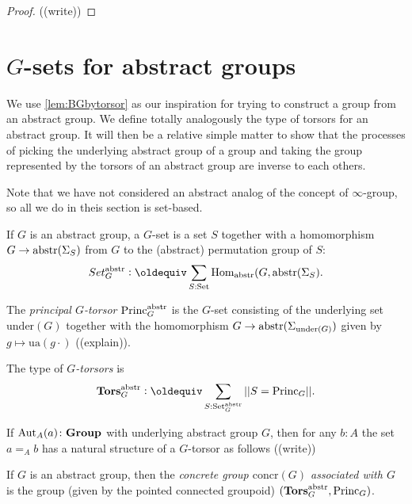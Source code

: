 \begin{proof}
  ((write))
\end{proof}

\section{$G$-sets for abstract groups}
\label{sec:Gsetforabstract}


We use \cref{lem:BGbytorsor} as our inspiration for trying to construct a group from an abstract group.  We define totally analogously the type of torsors for an abstract group.  It will then be a relative simple matter to show that the processes of picking the underlying abstract group of a group and taking the group represented by the torsors of an abstract group are inverse to each others.

Note that we have not considered an abstract analog of the concept of $\infty$-group, so all we do in theis section is set-based.

\begin{definition}
\label{def:abstrGtorsors}
  If $G$ is an abstract group, a $G$-set is a set $S$ together with a homomorphism
$G\to\mathrm{abstr}(\Sigma_S)$
from $G$ to the (abstract) permutation group of $S$:
$$Set_G^\abstr\defequi \sum_{S:\Set}\Hom_\abstr(G,\abstr(\Sigma_S).$$

The \emph{principal $G$-torsor} $\mathrm{Princ}_G^{\mathrm{abstr}}$ is the $G$-set consisting of the underlying set $\mathrm{under}(G)$ together with the homomorphism $G\to\mathrm{abstr}(\Sigma_{\mathrm{under}(G)})$ given by $g\mapsto \mathrm{ua}(g\cdot)$ ((explain)).

The type of \emph{$G$-torsors} is
$$\typetorsor_G^\abstr\defequi\sum_{S:\Set_G^\abstr}||S=\princ_G||.$$
\end{definition}
\begin{example}
  If $\mathrm{Aut}_A(a)\colon\mathbf{Group}$ with underlying abstract group $G$, then for any $b:A$ the set $a=_Ab$ has a natural structure of a $G$-torsor as follows ((write))
\end{example}

\newcommand{\concr}{\mathrm{concr}}
\begin{definition}
  If $G$ is an abstract group, then the \emph{concrete group $\concr(G)$ associated with $G$} is the group (given by the pointed connected groupoid) $(\mathbf{Tors}_G^{\mathrm{abstr}},\mathrm{Princ}_G)$.
\end{definition}


